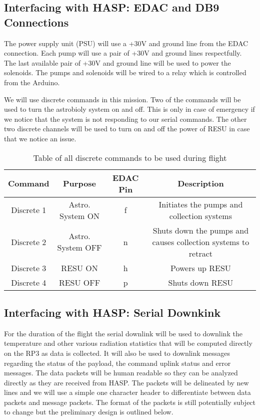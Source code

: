 \subsection{Interfacing with HASP: EDAC and DB9 Connections}

The power supply unit (PSU) will use a +30V and ground line from the EDAC connection.  Each pump will use a pair of +30V and ground lines respectfully.  The last available pair of +30V and ground line will be used to power the solenoids.  The pumps and solenoids will be wired to a relay which is controlled from the Arduino. 

We will use discrete commands in this mission.  Two of the commands will be used to turn the astrobioly system on and off.  This is only in case of emergency if we notice that the system is not responding to our serial commands.  The other two discrete channels will be used to turn on and off the power of RESU in case that we notice an issue.

\begin{table}[!ht]
  \centering
  \caption{Table of all discrete commands to be used during flight} 
  \label{tab:Dis-Commands}
  \bigskip
  \begin{tabular}{c|c|c|c}
    \multicolumn{1}{c|}{\bfseries Command} & \multicolumn{1}{c|}{\bfseries Purpose} &  \multicolumn{1}{c|}{\bfseries EDAC Pin} & \multicolumn{1}{c}{\bfseries Description} \\
      \hline
      \hline
      Discrete 1 & Astro. System ON & f & Initiates the pumps and collection systems \\
      Discrete 2 & Astro. System OFF & n & Shuts down the pumps and causes collection systems to retract \\
      Discrete 3 & RESU ON & h & Powers up RESU \\
      Discrete 4 & RESU OFF & p & Shuts down RESU \\
  \end{tabular}
  \medskip
\end{table}

\subsection{Interfacing with HASP: Serial Downkink}
For the duration of the flight the serial downlink will be used to downlink the temperature and other various radiation statistics that will be computed directly on the RP\num{3} as data is collected. It will also be used to downlink messages regarding the status of the payload, the command uplink status and error messages. The data packets will be human readable so they can be analyzed directly as they are received from HASP. The packets will be delineated by new lines and we will use a simple one character header to differentiate between data packets and message packets. The format of the packets is still potentially subject to change but the preliminary design is outlined below.




